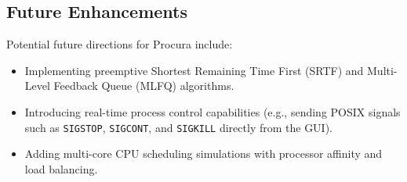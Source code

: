 \documentclass[12pt,a4paper]{article}
\begin{document}
\subsection{Future Enhancements}
Potential future directions for Procura include:
\begin{itemize}
    \item Implementing preemptive Shortest Remaining Time First (SRTF) and Multi-Level Feedback Queue (MLFQ) algorithms.
    \item Introducing real-time process control capabilities (e.g., sending POSIX signals such as \texttt{SIGSTOP}, \texttt{SIGCONT}, and \texttt{SIGKILL} directly from the GUI).
    \item Adding multi-core CPU scheduling simulations with processor affinity and load balancing.
\end{itemize}



\end{document}
